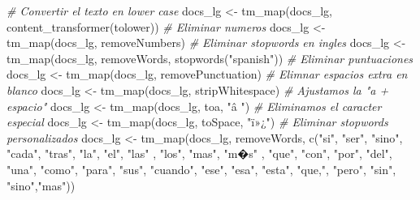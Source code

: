 \documentclass[
]{article}
\newenvironment{Shaded}{\begin{snugshade}}{\end{snugshade}}
\newcommand{\CommentTok}[1]{\textcolor[rgb]{0.56,0.35,0.01}{\textit{#1}}}
\newcommand{\FunctionTok}[1]{\textcolor[rgb]{0.00,0.00,0.00}{#1}}
\newcommand{\NormalTok}[1]{#1}
\newcommand{\OtherTok}[1]{\textcolor[rgb]{0.56,0.35,0.01}{#1}}
\newcommand{\StringTok}[1]{\textcolor[rgb]{0.31,0.60,0.02}{#1}}
\begin{document}
\begin{Shaded}
\begin{Highlighting}[]
\CommentTok{\# Convertir el texto en lower case}
\NormalTok{docs\_lg }\OtherTok{\textless{}{-}} \FunctionTok{tm\_map}\NormalTok{(docs\_lg, }\FunctionTok{content\_transformer}\NormalTok{(tolower))}
\CommentTok{\# Eliminar numeros}
\NormalTok{docs\_lg }\OtherTok{\textless{}{-}} \FunctionTok{tm\_map}\NormalTok{(docs\_lg, removeNumbers)}
\CommentTok{\# Eliminar stopwords en ingles}
\NormalTok{docs\_lg }\OtherTok{\textless{}{-}} \FunctionTok{tm\_map}\NormalTok{(docs\_lg, removeWords, }\FunctionTok{stopwords}\NormalTok{(}\StringTok{"spanish"}\NormalTok{))}
\CommentTok{\# Eliminar puntuaciones}
\NormalTok{docs\_lg }\OtherTok{\textless{}{-}} \FunctionTok{tm\_map}\NormalTok{(docs\_lg, removePunctuation)}
\CommentTok{\# Elimnar espacios extra en blanco}
\NormalTok{docs\_lg }\OtherTok{\textless{}{-}} \FunctionTok{tm\_map}\NormalTok{(docs\_lg, stripWhitespace)}
\CommentTok{\# Ajustamos la "a + espacio" }
\NormalTok{docs\_lg }\OtherTok{\textless{}{-}} \FunctionTok{tm\_map}\NormalTok{(docs\_lg, toa, }\StringTok{"â "}\NormalTok{)}
\CommentTok{\# Eliminamos el caracter especial}
\NormalTok{docs\_lg }\OtherTok{\textless{}{-}} \FunctionTok{tm\_map}\NormalTok{(docs\_lg, toSpace, }\StringTok{"ï»¿"}\NormalTok{)}
\CommentTok{\# Eliminar stopwords personalizados}
\NormalTok{docs\_lg }\OtherTok{\textless{}{-}} \FunctionTok{tm\_map}\NormalTok{(docs\_lg, removeWords, }\FunctionTok{c}\NormalTok{(}\StringTok{"si"}\NormalTok{, }\StringTok{"ser"}\NormalTok{, }\StringTok{"sino"}\NormalTok{, }\StringTok{"cada"}\NormalTok{, }\StringTok{"tras"}\NormalTok{, }\StringTok{"la"}\NormalTok{, }\StringTok{"el"}\NormalTok{, }\StringTok{"las"}\NormalTok{ , }\StringTok{"los"}\NormalTok{, }\StringTok{"mas"}\NormalTok{, }\StringTok{"m�s"}\NormalTok{ ,                                       }\StringTok{"que"}\NormalTok{, }\StringTok{"con"}\NormalTok{, }\StringTok{"por"}\NormalTok{, }\StringTok{"del"}\NormalTok{, }\StringTok{"una"}\NormalTok{, }\StringTok{"como"}\NormalTok{, }\StringTok{"para"}\NormalTok{, }\StringTok{"sus"}\NormalTok{, }\StringTok{"cuando"}\NormalTok{, }\StringTok{"ese"}\NormalTok{, }\StringTok{"esa"}\NormalTok{,}
                                          \StringTok{"esta"}\NormalTok{, }\StringTok{"que,"}\NormalTok{, }\StringTok{"pero"}\NormalTok{, }\StringTok{"sin"}\NormalTok{, }\StringTok{"sino"}\NormalTok{,}\StringTok{"mas"}\NormalTok{))}
\end{Highlighting}
\end{Shaded}
\end{document}
